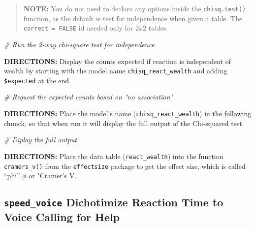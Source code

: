 \documentclass[
]{article}
\newenvironment{Shaded}{\begin{snugshade}}{\end{snugshade}}
\newcommand{\CommentTok}[1]{\textcolor[rgb]{0.56,0.35,0.01}{\textit{#1}}}
\begin{document}
\begin{quote}
\textbf{NOTE:} You do not need to declare any options inside the
\texttt{chisq.test()} function, as the default is test for independence
when given a table. The \texttt{correct\ =\ FALSE} id needed only for
\(2x2\) tables.
\end{quote}

\begin{Shaded}
\begin{Highlighting}[]
\CommentTok{\# Run the 2{-}way chi{-}square test for independence}
\end{Highlighting}
\end{Shaded}

\textbf{DIRECTIONS:} Display the counts expected if reaction is
independent of wealth by starting with the model name
\texttt{chisq\_react\_wealth} and adding \texttt{\$expected} at the end.

\begin{Shaded}
\begin{Highlighting}[]
\CommentTok{\# Request the expected counts based on "no association"}
\end{Highlighting}
\end{Shaded}

\textbf{DIRECTIONS:} Place the model's name
(\texttt{chisq\_react\_wealth}) in the following chunck, so that when
run it will display the full output of the Chi-squared test.

\begin{Shaded}
\begin{Highlighting}[]
\CommentTok{\# Diplay the full output}
\end{Highlighting}
\end{Shaded}

\textbf{DIRECTIONS:} Place the data table (\texttt{react\_wealth}) into
the function \texttt{cramers\_v()} from the \texttt{effectsize} package
to get the effect size, which is called ``phi'' \(\phi\) or "Cramer's V.

\clearpage

\hypertarget{speed_voice-dichotimize-reaction-time-to-voice-calling-for-help}{%
\subsection{\texorpdfstring{\texttt{speed\_voice} Dichotimize Reaction
Time to Voice Calling for
Help}{speed\_voice Dichotimize Reaction Time to Voice Calling for Help}}\label{speed_voice-dichotimize-reaction-time-to-voice-calling-for-help}}
\end{document}
